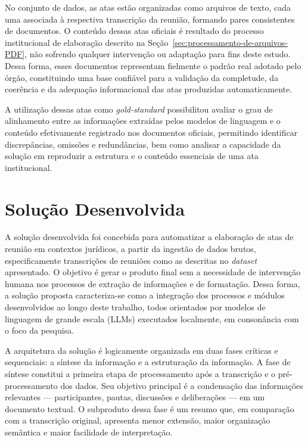 No conjunto de dados, as atas estão organizadas como arquivos de texto, cada uma associada à respectiva transcrição da reunião, formando pares consistentes de documentos. O conteúdo dessas atas oficiais é resultado do processo institucional de elaboração descrito na Seção~\ref{sec:processamento-de-arquivos-PDF}, não sofrendo qualquer intervenção ou adaptação para fins deste estudo. Dessa forma, esses documentos representam fielmente o padrão real adotado pelo órgão, constituindo uma base confiável para a validação da completude, da coerência e da adequação informacional das atas produzidas automaticamente.

A utilização dessas atas como \textit{gold-standard} possibilitou avaliar o grau de alinhamento entre as informações extraídas pelos modelos de linguagem e o conteúdo efetivamente registrado nos documentos oficiais, permitindo identificar discrepâncias, omissões e redundâncias, bem como analisar a capacidade da solução em reproduzir a estrutura e o conteúdo essenciais de uma ata institucional.

\section{Solução Desenvolvida}
\label{sec:solucao-desenvolvida-introducao}

A solução desenvolvida foi concebida para automatizar a elaboração de atas de reunião em contextos jurídicos, a partir da ingestão de dados brutos, especificamente transcrições de reuniões como as descritas no \textit{dataset} apresentado. O objetivo é gerar o produto final sem a necessidade de intervenção humana nos processos de extração de informações e de formatação. Dessa forma, a solução proposta caracteriza-se como a integração dos processos e módulos desenvolvidos ao longo deste trabalho, todos orientados por modelos de linguagem de grande escala (LLMs) executados localmente, em consonância com o foco da pesquisa.

A arquitetura da solução é logicamente organizada em duas fases críticas e sequenciais: a síntese da informação e a estruturação da informação. A fase de síntese constitui a primeira etapa de processamento após a transcrição e o pré-processamento dos dados. Seu objetivo principal é a condensação das informações relevantes — participantes, pautas, discussões e deliberações — em um documento textual. O subproduto dessa fase é um resumo que, em comparação com a transcrição original, apresenta menor extensão, maior organização semântica e maior facilidade de interpretação.

